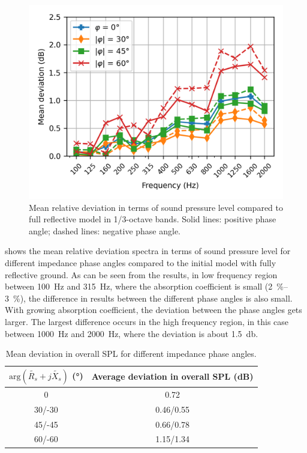 \begin{figure}
	\centering
	\includegraphics[width=0.7\linewidth]{fig/chap5/impedance/freq_spectrum/average_gap.png}
	\caption{Mean relative deviation in terms of sound pressure level compared to full reflective model in 1/3-octave bands. Solid lines: positive phase angle; dashed lines: negative phase angle.}
	\label{fig:gap_freq_spectrum_impedance}
\end{figure}

 shows the mean relative deviation spectra in terms of sound pressure level for different impedance phase angles compared to the initial model with fully reflective ground. As can be seen from the results, in low frequency region between \SI{100}{\hertz} and \SI{315}{\hertz}, where the absorption coefficient is small (\SIrange{2}{3}{\percent}), the difference in results between the different phase angles is also small. With growing absorption coefficient, the deviation between the phase angles gets larger. The largest difference occurs in the high frequency region, in this case between \SI{1000}{\hertz} and \SI{2000}{\hertz}, where the deviation is about \SI{1.5}{\decibel}.

\begin{table}
	\centering
	\caption{Mean deviation in overall SPL for different impedance phase angles.}
	\label{tab:mean_devaition_impedance}
	\begin{tabular}{cc}
		\toprule
		$\text{arg}(\tilde{R_s} + j\tilde{X_s})$ (°) & Average deviation in overall SPL (dB) \\
		\midrule
		0                         & 0.72                                      \\
		30/-30                    & 0.46/0.55                                 \\
		45/-45                    & 0.66/0.78                                 \\
		60/-60                    & 1.15/1.34                                 \\
		\bottomrule
	\end{tabular}
\end{table}

